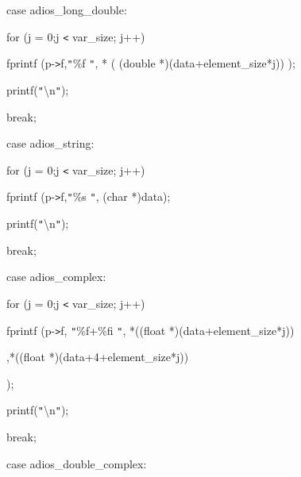 \vspace{10pt}
case adios\_long\_double:

\vspace{10pt}
\parindent=100pt
for (j = 0;j \texttt{<} var\_size; j++)

\vspace{10pt}
\parindent=72pt
fprintf (p-\texttt{>}f,\texttt{"}\%f \texttt{"}, * ( (double *)(data+element\_size*j)) 
);

\vspace{10pt}
\parindent=57pt
printf(\texttt{"}\textbackslash{}n\texttt{"});

\vspace{10pt}
break;

\vspace{10pt}
\parindent=100pt
case adios\_string:

\vspace{10pt}
\parindent=57pt
for (j = 0;j \texttt{<} var\_size; j++)

\vspace{10pt}
\parindent=72pt
fprintf (p-\texttt{>}f,\texttt{"}\%s \texttt{"}, (char *)data);

\vspace{10pt}
\parindent=57pt
printf(\texttt{"}\textbackslash{}n\texttt{"});

\vspace{10pt}
break;

\vspace{10pt}
\parindent=100pt
case adios\_complex:

\vspace{10pt}
\parindent=57pt
for (j = 0;j \texttt{<} var\_size; j++)

\vspace{10pt}
\parindent=72pt
fprintf (p-\texttt{>}f, \texttt{"}\%f+\%fi \texttt{"}, *((float *)(data+element\_size*j))

\vspace{10pt}
\parindent=100pt
,*((float *)(data+4+element\_size*j))

\vspace{10pt}
);

\vspace{10pt}
\parindent=158pt
printf(\texttt{"}\textbackslash{}n\texttt{"});

\vspace{10pt}
\parindent=57pt
break;

\vspace{10pt}
\parindent=43pt
case adios\_double\_complex:

